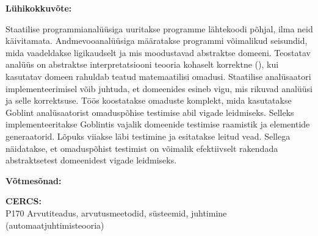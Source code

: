 \documentclass[../thesis.tex]{subfiles}
\begin{document}
\newpage
{}

\noindent\textbf{\large \mytitle}
\vspace*{1ex}

\noindent\textbf{Lühikokkuvõte:} 

\noindent
Staatilise programmianalüüsiga uuritakse programme lähtekoodi põhjal, ilma neid käivitamata.
Andmevooanalüüsiga määratakse programmi võimalikud seisundid, mida vaadeldakse ligikaudselt ja mis moodustavad abstraktse domeeni. Teostatav analüüs on abstraktse interpretatsiooni teooria kohaselt korrektne (), kui kasutatav domeen rahuldab teatud matemaatilisi omadusi.
Staatilise analüsaatori implementeerimisel võib juhtuda, et domeenides esineb vigu, mis rikuvad analüüsi ja selle korrektsuse.
Töös koostatakse omaduste komplekt, mida kasutatakse Goblint analüsaatorist omaduspõhise testimise abil vigade leidmiseks.
Selleks implementeeritakse Goblintis vajalik domeenide testimise raamistik ja elementide generaatorid. Lõpuks viiakse läbi testimine ja esitatakse leitud vead.
Sellega näidatakse, et omaduspõhist testimist on võimalik efektiivselt rakendada abstraktsetest domeenidest vigade leidmiseks.

\vspace*{1ex}

\noindent\textbf{Võtmesõnad:}\\
\mykeywords

\vspace*{1ex}

\noindent\textbf{CERCS:}\\
P170 Arvutiteadus, arvutusmeetodid, süsteemid, juhtimine (automaatjuhtimisteooria)
\end{document}
